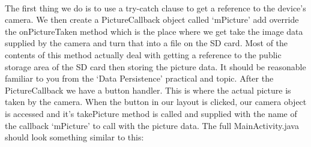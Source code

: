 \paragraph{} The first thing we do is to use a try-catch clause to get a reference to the device's camera. We then create a PictureCallback object called `mPicture' add override the onPictureTaken method which is the place where we get take the image data supplied by the camera and turn that into a file on the SD card. Most of the contents of this method actually deal with getting a reference to the public storage area of the SD card then storing the picture data. It should be reasonable familiar to you from the `Data Persistence' practical and topic. After the PictureCallback we have a button handler. This is where the actual picture is taken by the camera. When the button in our layout is clicked, our camera object is accessed and it's takePicture method is called and supplied with the name of the callback `mPicture' to call with the picture data. The full MainActivity.java should look something similar to this:

